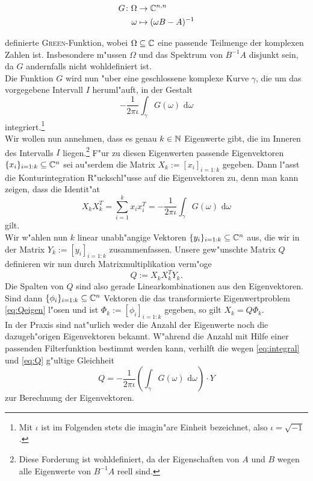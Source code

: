   \begin{align*}
  G\colon\Omega &\to\mathbb{C}^{n,n}\\
  \omega &\mapsto (\omega B - A)^{-1}
  \end{align*}

definierte  \textsc{Green}-Funktion, wobei $\Omega \subseteq \mathbb{C}$ eine passende
Teilmenge der komplexen Zahlen ist. Insbesondere m"ussen $\Omega$ und das
Spektrum von $B^{-1}A$ disjunkt sein, da $G$ andernfalls nicht wohldefiniert ist.\\

Die Funktion $G$ wird nun "uber eine geschlossene komplexe Kurve $\gamma$,
die um das vorgegebene Intervall $I$ heruml"auft, in der Gestalt
\[
-\frac{1}{2\pi\iota}\int_\gamma G(\omega)\text{ d}\omega
\]
integriert.\footnote{Mit $\iota$ ist im Folgenden stets die imagin"are Einheit bezeichnet,
also $\iota = \sqrt{-1}$.}\\

Wir wollen nun annehmen,
dass es genau $k\in\mathbb{N}$ Eigenwerte gibt,
die im Inneren des Intervalls $I$ liegen.\footnote{Diese Forderung ist wohldefiniert, da
der Eigenschaften von $A$ und $B$ wegen alle Eigenwerte von $B^{-1}A$ reell sind.}
F"ur zu diesen Eigenwerten passende Eigenvektoren $\{x_i\}_{i=1:k} \subseteq \mathbb{C}^n$ sei au"serdem die Matrix
$X_k := [x_i]_{i=1:k}$ gegeben.
Dann l"asst die Konturintegration R"uckschl"usse auf die Eigenvektoren zu, denn man kann
zeigen, dass die Identit"at
\begin{equation}\label{eq:integral}
X_k X_k^T = \sum_{i=1}^k x_i x_i^T =
-\frac{1}{2\pi\iota}\int_\gamma G(\omega)\text{ d}\omega
\end{equation}
gilt.\\

Wir w"ahlen nun $k$ linear unabh"angige Vektoren $\{y_i\}_{i=1:k} \subseteq \mathbb{C}^n$
aus, die wir in der Matrix $Y_k := [ y_i ]_{i=1:k}$ zusammenfassen.
Unsere gew"unschte Matrix $Q$ definieren wir nun durch Matrixmultiplikation
verm"oge
\begin{equation}\label{eq:Q}
Q := X_k X_k^T Y_k.
\end{equation}
Die Spalten von $Q$ sind also gerade Linearkombinationen aus den Eigenvektoren.
Sind dann $\{\phi_i\}_{i=1:k} \subseteq \mathbb{C}^n$ Vektoren die das transformierte
Eigenwertproblem \eqref{eq:Qeigen} l"osen
und ist $\Phi_k:=[\phi_i]_{i=1:k}$ gegeben,
so gilt $X_k = Q \Phi_k$.\\

In der Praxis sind nat"urlich weder die Anzahl der Eigenwerte noch die dazugeh"origen Eigenvektoren
bekannt. W"ahrend die Anzahl mit Hilfe einer passenden Filterfunktion bestimmt werden kann,
verhilft die wegen \eqref{eq:integral} und \eqref{eq:Q} g"ultige Gleichheit
\begin{equation}\label{eq:solution}
Q = -\frac{1}{2\pi\iota}\left(\int_\gamma G(\omega)\text{ d}\omega\right)\cdot Y
\end{equation}
zur Berechnung der Eigenvektoren.

